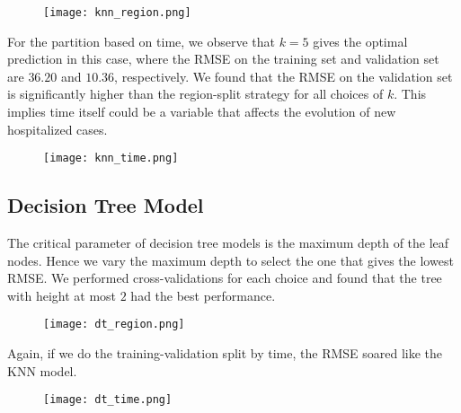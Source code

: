 \documentclass[journal,11pt]{IEEEtran}
\begin{document}
\begin{figure}[H]%
\begin {center}
\texttt{[image: knn\_region.png]}
\label{fig:ecg}
\end {center}
\end{figure}
For the partition based on time, we observe that $k=5$ gives the optimal prediction in this case, where the RMSE on the training set and validation set are $36.20$ and $10.36$, respectively. We found that the RMSE on the validation set is significantly higher than the region-split strategy for all choices of $k$. This implies time itself could be a variable that affects the evolution of new hospitalized cases.
\begin{figure}[H]%
\begin {center}
\texttt{[image: knn\_time.png]}
\label{fig:ecg}
\end {center}
\end{figure}
\begin{center}
    \subsection{Decision Tree Model}
\end{center}
\indent \indent The critical parameter of decision tree models is the maximum depth of the leaf nodes. Hence we vary the maximum depth to select the one that gives the lowest RMSE. We performed cross-validations for each choice and found that the tree with height at most $2$ had the best performance.
\begin{figure}[H]%
\begin {center}
\texttt{[image: dt\_region.png]}
\label{fig:ecg}
\end {center}
\end{figure}
Again, if we do the training-validation split by time, the RMSE soared like the KNN model.
\begin{figure}[H]%
\begin {center}
\texttt{[image: dt\_time.png]}
\label{fig:ecg}
\end {center}
\end{figure}
\end{document}
